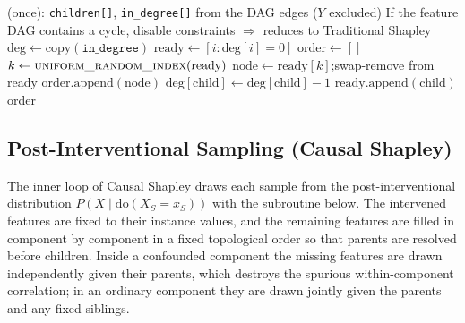 \documentclass[12pt,a4paper,oneside]{article}
\begin{document}
\begin{algorithm}[H]
  \caption{SAMPLE\_TOPOLOGICAL\_ORDERING --- uniform random linear extension (Kahn)}
  \label{alg:topo}
  \begin{algorithmic}[1]
    \PRECOMPUTE (once): \texttt{children[]}, \texttt{in\_degree[]} from the DAG edges ($Y$ excluded)
    \Statex \hspace{2.5em} If the feature DAG contains a cycle, disable constraints $\Rightarrow$ reduces to Traditional Shapley
      \State $\text{deg} \gets \text{copy}(\texttt{in\_degree})$
      \State $\text{ready} \gets [i : \text{deg}[i] = 0]$  
      \State $\text{order} \gets []$
        \State $k \gets \textsc{uniform\_random\_index}(\text{ready})$
        \State $\text{node} \gets \text{ready}[k]$;\quad swap-remove from ready  
        \State $\text{order}.\text{append}(\text{node})$
          \State $\text{deg}[\text{child}] \gets \text{deg}[\text{child}] - 1$
          \quad $\text{ready}.\text{append}(\text{child})$\EndIf
        \EndFor
      \EndWhile
      \Return order  
    \EndFunction
  \end{algorithmic}
\end{algorithm}

\subsection{Post-Interventional Sampling (Causal Shapley)}

The inner loop of Causal Shapley draws each sample from the post-interventional distribution $P(X \mid \mathrm{do}(X_S = x_S))$ with the subroutine below. The intervened features are fixed to their instance values, and the remaining features are filled in component by component in a fixed topological order so that parents are resolved before children. Inside a confounded component the missing features are drawn independently given their parents, which destroys the spurious within-component correlation; in an ordinary component they are drawn jointly given the parents and any fixed siblings.
\end{document}
